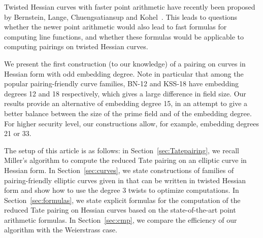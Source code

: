 Twisted Hessian curves with faster point arithmetic have recently been proposed by
Bernstein, Lange, Chuengsatiansup and Kohel~\cite{2015/hessian}.
This leads to questions whether the newer point arithmetic would also lead to fast formulas for computing line functions,
and whether these formulas would be applicable to computing pairings on twisted Hessian curves.

We present the first construction (to our knowledge) of a pairing on curves in Hessian form with odd embedding degree. Note in particular that among the popular pairing-friendly curve families,
BN-12 and KSS-18 have embedding degrees 12 and 18 respectively, which gives a large difference in field size. Our results provide an alternative of embedding degree 15, in an attempt to give a better balance between the size of the prime field and of the embedding degree. For higher security level, our constructions allow, for example, embedding degrees 21 or 33.

The setup of this article is as follows:
in Section~\ref{sec:Tatepairing}, we recall Miller's algorithm to compute the reduced Tate pairing on an elliptic curve in Hessian form.
In Section~\ref{sec:curves}, we state constructions of families of pairing-friendly elliptic curves given in \cite{2010/freeman} that can be written in twisted Hessian form and show how to use the degree 3 twists to optimize computations.
In Section~\ref{sec:formulas}, we state explicit formulas for the computation of the reduced Tate pairing on Hessian curves based on the state-of-the-art point arithmetic formulas.
In Section~\ref{sec:cmp}, we compare the efficiency of our algorithm with the Weierstrass case.


